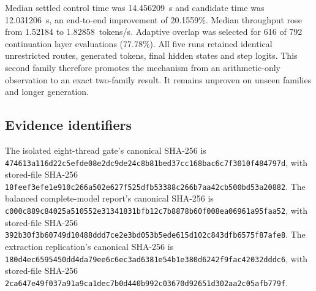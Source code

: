 Median settled control time was 14.456209~s and candidate time was 12.031206~s,
an end-to-end improvement of 20.1559\%.  Median throughput rose from 1.52184 to
1.82858~tokens/s.  Adaptive overlap was selected for 616 of 792 continuation
layer evaluations (77.78\%).  All five runs retained identical unrestricted
routes, generated tokens, final hidden states and step logits.  This second
family therefore promotes the mechanism from an arithmetic-only observation to
an exact two-family result.  It remains unproven on unseen families and longer
generation.

\subsection{Evidence identifiers}

The isolated eight-thread gate's canonical SHA-256 is
\texttt{474613a116d22c5efde08e2dc9de24c8b81bed37cc168bac6c7f3010f484797d},
with stored-file SHA-256
\texttt{18feef3efe1e910c266a502e627f525dfb53388c266b7aa42cb500bd53a20882}.
The balanced complete-model report's canonical SHA-256 is
\texttt{c000c889c84025a510552e31341831bfb12c7b8878b60f008ea06961a95faa52},
with stored-file SHA-256
\texttt{392b30f3b60749d10488ddd7ce2e3bd053b5ede615d102c843dfb6575f87afe8}.
The extraction replication's canonical SHA-256 is
\texttt{180d4ec6595450dd4da79ee6c6ec3ad6381e54b1e380d6242f9fac42032dddc6},
with stored-file SHA-256
\texttt{2ca647e49f037a91a9ca1dec7b0d440b992c03670d92651d302aa2c05afb779f}.
